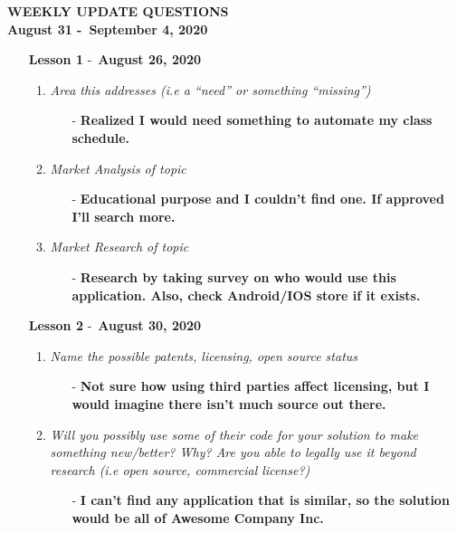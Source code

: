 \begin{center}
  \Huge\textbf{WEEKLY UPDATE QUESTIONS}\\
  \large\textbf{August 31 -\ September 4, 2020}
\end{center}
\renewcommand{\labelenumii}{\Roman{enumii}.~}
\begin{enumerate}
  \item[\textbf{Lesson 1}] -\ \textbf{August 26, 2020}
  \begin{enumerate}
    \item \textsl{Area this addresses (i.e a ``need'' or something ``missing'')}
    \begin{enumerate}
      \item[-] \textbf{Realized I would need something to automate my class schedule.}
    \end{enumerate}
    \item \textsl{Market Analysis of topic}
    \begin{enumerate}
      \item[-] \textbf{Educational purpose and I couldn't find one. If approved I'll search more.}
    \end{enumerate}
    \item \textsl{Market Research of topic}
    \begin{enumerate}
      \item[-] \textbf{Research by taking survey on who would use this application. Also, check Android/IOS store if it exists.}
    \end{enumerate}
  \end{enumerate} 
  \item[\textbf{Lesson 2}] -\ \textbf{August 30, 2020}
  \begin{enumerate}
    \item \textsl{Name the possible patents, licensing, open source status}
    \begin{enumerate}
      \item[-] \textbf{Not sure how using third parties affect licensing, but I would imagine there isn't much source out there.}
    \end{enumerate}
    \item \textsl{Will you possibly use some of their code for your solution to make something new/better? Why? Are you able to legally use it beyond research (i.e open source, commercial license?)}
    \begin{enumerate}
      \item[-] \textbf{I can't find any application that is similar, so the solution would be all of Awesome Company Inc.}

\end{enumerate}
\end{enumerate}
\end{enumerate}
